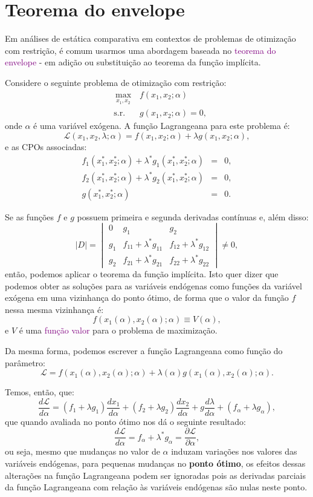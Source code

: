 \documentclass[12pt]{article}
\begin{document}
\section{Teorema do envelope}

Em análises de estática comparativa em contextos de problemas de otimização com restrição, é comum usarmos uma abordagem baseada no \textcolor{purple}{teorema do envelope} - em adição ou substituição ao teorema da função implícita.

Considere o seguinte problema de otimização com restrição:
\begin{eqnarray}
    & \max_{\substack{x_1, x_2}} & f(x_1, x_2; \alpha) \nonumber \\
    & \text{s.r.} & g(x_1, x_2; \alpha) = 0, \nonumber
\end{eqnarray}
onde $\alpha$ é uma variável exógena. A função Lagrangeana para este problema é:
\[
\mathcal{L}(x_1, x_2, \lambda; \alpha) = f(x_1, x_2; \alpha) + \lambda g(x_1, x_2; \alpha),    
\]
e as CPOs associadas:
\begin{eqnarray*}
    f_1(x_1^*, x_2^*; \alpha) + \lambda^* g_1(x_1^*, x_2^*; \alpha) &=& 0, \\
    f_2(x_1^*, x_2^*; \alpha) + \lambda^* g_2(x_1^*, x_2^*; \alpha) &=& 0, \\
    g(x_1^*, x_2^*; \alpha) &=& 0.
\end{eqnarray*}

Se as funções $f$ e $g$ possuem primeira e segunda derivadas contínuas e, além disso:
\[
|D| = \begin{vmatrix}
    0 & g_1 & g_2 \\
    g_1 & f_{11} + \lambda^*g_{11} & f_{12} + \lambda^*g_{12} \\
    g_2 & f_{21} + \lambda^*g_{21} & f_{22} + \lambda^*g_{22}
\end{vmatrix}  \neq 0,
\]
então, podemos aplicar o teorema da função implícita. Isto quer dizer que podemos obter as soluções para as variáveis endógenas como funções da variável exógena em uma vizinhança do ponto ótimo, de forma que o valor da função $f$ nessa mesma vizinhança é:
\[
f(x_1(\alpha), x_2(\alpha); \alpha) \equiv V(\alpha),
\]
e $V$ é uma \textcolor{purple}{função valor} para o problema de maximização.

Da mesma forma, podemos escrever a função Lagrangeana como função do parâmetro:
\[
\mathcal{L} = f(x_1(\alpha), x_2(\alpha); \alpha) + \lambda(\alpha) g(x_1(\alpha),x_2(\alpha);\alpha).
\]

Temos, então, que:
\[
\frac{d\mathcal{L}}{d\alpha} = (f_1 + \lambda g_1)\frac{d x_1}{d\alpha} + (f_2 + \lambda g_2)\frac{d x_2}{d\alpha} + g\frac{d\lambda }{d\alpha} + (f_\alpha + \lambda g_\alpha),
\]
que quando avaliada no ponto ótimo nos dá o seguinte resultado:
\[
\frac{d\mathcal{L}}{d\alpha} = f_\alpha + \lambda^* g_\alpha = \frac{\partial\mathcal{L}}{\partial\alpha},
\]
ou seja, mesmo que mudanças no valor de $\alpha$ induzam variações nos valores das variáveis endógenas, para pequenas mudanças no \textbf{ponto ótimo}, os efeitos dessas alterações na função Lagrangeana podem ser ignoradas pois as derivadas parciais da função Lagrangeana com relação às variáveis endógenas são nulas neste ponto.
\end{document}

